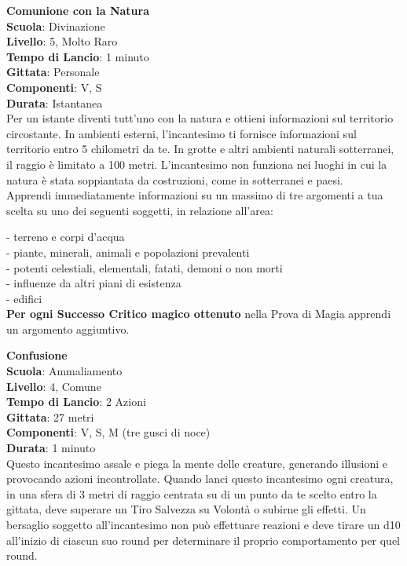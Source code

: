 \begin{multicols}{2}
\medskip\textbf{Comunione con la Natura}\\
\textbf{Scuola}: Divinazione\\
\textbf{Livello}: 5, Molto Raro\\
\textbf{Tempo di Lancio}: 1 minuto\\
\textbf{Gittata}: Personale\\
\textbf{Componenti}: V, S\\
\textbf{Durata}: Istantanea\\
Per un istante diventi tutt'uno con la natura e ottieni informazioni sul territorio circostante. In ambienti esterni, l'incantesimo ti fornisce informazioni sul territorio entro 5 chilometri da te. In grotte e altri ambienti naturali sotterranei, il raggio è limitato a 100 metri. L'incantesimo non funziona nei luoghi in cui la natura è stata soppiantata da costruzioni, come in sotterranei e paesi.\\
Apprendi immediatamente informazioni su un massimo di tre argomenti a tua scelta su uno dei seguenti soggetti, in relazione all'area:

- terreno e corpi d'acqua\\
- piante, minerali, animali e popolazioni prevalenti\\
- potenti celestiali, elementali, fatati, demoni o non morti\\
- influenze da altri piani di esistenza\\
- edifici\\
\textbf{Per ogni Successo Critico magico ottenuto} nella Prova di Magia apprendi un argomento aggiuntivo.

\medskip\textbf{Confusione}\\
\textbf{Scuola}: Ammaliamento\\
\textbf{Livello}: 4, Comune\\
\textbf{Tempo di Lancio}: 2 Azioni\\
\textbf{Gittata}: 27 metri\\
\textbf{Componenti}: V, S, M (tre gusci di noce)\\
\textbf{Durata}: 1 minuto\\
Questo incantesimo assale e piega la mente delle creature, generando illusioni e provocando azioni incontrollate. Quando lanci questo incantesimo ogni creatura, in una sfera di 3 metri di raggio centrata su di un punto da te scelto entro la gittata, deve superare un Tiro Salvezza su Volontà o subirne gli effetti. Un bersaglio soggetto all'incantesimo non può effettuare reazioni e deve tirare un d10 all'inizio di ciascun suo round per determinare il proprio comportamento per quel round.


\end{multicols}
